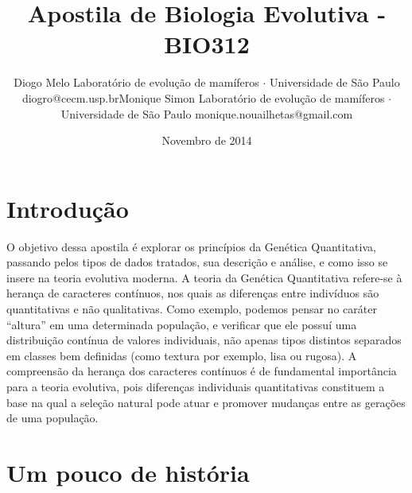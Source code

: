 \documentclass[portuges,]{tufte-handout}
\title{Apostila de Biologia Evolutiva - BIO312}
\author{\Large Diogo Melo\vspace{0.05in} \newline\normalsize Laboratório de evolução de mamíferos $\cdot$ Universidade de São Paulo \newline\footnotesize diogro@cecm.usp.br\vspace*{0.2in}\newline \Large Monique Simon\vspace{0.05in} \newline\normalsize Laboratório de evolução de mamíferos $\cdot$ Universidade de São Paulo \newline\footnotesize monique.nouailhetas@gmail.com\vspace*{0.2in}\newline }
\date{Novembro de 2014}
\begin{document}
\maketitle




\newpage

\section{Introdução}\label{introduuxe7uxe3o}

O objetivo dessa apostila é explorar os princípios da Genética
Quantitativa, passando pelos tipos de dados tratados, sua descrição e
análise, e como isso se insere na teoria evolutiva moderna. A teoria da
Genética Quantitativa refere-se à herança de caracteres contínuos, nos
quais as diferenças entre indivíduos são quantitativas e não
qualitativas. Como exemplo, podemos pensar no caráter ``altura'' em uma
determinada população, e verificar que ele possuí uma distribuição
contínua de valores individuais, não apenas tipos distintos separados em
classes bem definidas (como textura por exemplo, lisa ou rugosa). A
compreensão da herança dos caracteres contínuos é de fundamental
importância para a teoria evolutiva, pois diferenças individuais
quantitativas constituem a base na qual a seleção natural pode atuar e
promover mudanças entre as gerações de uma população.

\section{Um pouco de história}\label{um-pouco-de-histuxf3ria}
\end{document}
